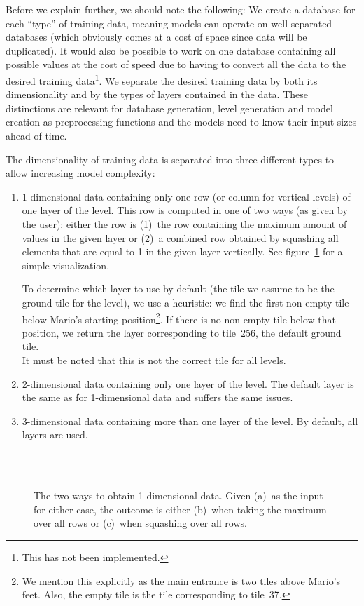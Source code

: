Before we explain further, we should note the following: We create a
database for each ``type'' of training data, meaning models can
operate on well separated databases (which obviously comes at a cost
of space since data will be duplicated). It would also be possible to
work on one database containing all possible values at the cost of
speed due to having to convert all the data to the desired training
data\footnote{This has not been implemented.}. We separate the desired
training data by both its dimensionality and by the types of layers
contained in the data. These distinctions are relevant for database
generation, level generation and model creation as preprocessing
functions and the models need to know their input sizes ahead of time.

The dimensionality of training data is separated into three different
types to allow increasing model complexity:
\begin{enumerate}
\item 1-dimensional data containing only one row (or column for
  vertical levels) of one layer of the level. This row is computed in
  one of two ways (as given by the user): either the row is (1)~the
  row containing the maximum amount of values in the given layer or
  (2)~a combined row obtained by squashing all elements that are equal
  to 1 in the given layer vertically. See
  figure~\ref{fig:squash-example} for a simple visualization.

  To determine which layer to use by default (the tile we assume to be
  the ground tile for the level), we use a heuristic: we find the
  first non-empty tile below Mario's starting position\footnote{We
    mention this explicitly as the main entrance is two tiles above
    Mario's feet. Also, the empty tile is the tile corresponding to
    tile~37.}. If there is no non-empty tile below that position, we
  return the layer corresponding
  to tile~256, the default ground tile. \\
  It must be noted that this is not the correct tile for all levels.
\item 2-dimensional data containing only one layer of the level. The
  default layer is the same as for 1-dimensional data and suffers the
  same issues.
\item 3-dimensional data containing more than one layer of the
  level. By default, all layers are used.
\end{enumerate}

\begin{figure}[t]
  \centering
  \\
  \\
  \caption{The two ways to obtain 1-dimensional data. Given (a)~as the
    input for either case, the outcome is either (b)~when taking the
    maximum over all rows or (c)~when squashing over all rows.}
  \label{fig:squash-example}
\end{figure}

